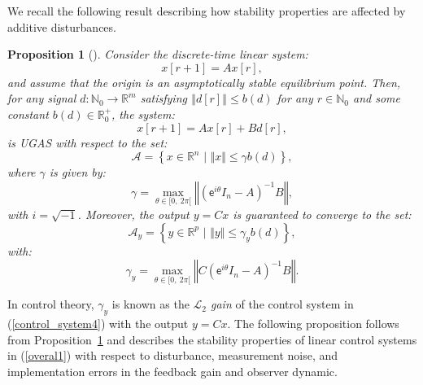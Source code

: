 \documentclass{amsart}
\newtheorem{proposition}[theorem]{Proposition}
\numberwithin{equation}{section}
\newcommand{\R}{{\mathbb{R}}}
\newcommand{\N}{{\mathbb{N}}}
\begin{document}
We recall the following result describing how stability properties are affected by additive disturbances.
\begin{proposition}[\cite{anta}]
\label{prop:anta}
Consider the discrete-time linear system:
\begin{equation}\nonumber
x[r+1]=Ax[r],
\end{equation}
and assume that the origin is an asymptotically stable equilibrium point. Then, for any signal $d:\N_0\rightarrow\R^m$ satisfying $\left\Vert{d}[r]\right\Vert\leq b(d)$ for any $r\in\N_0$ and some constant $b(d)\in\R_0^+$, the system:
\begin{equation}\label{control_system4}
x[r+1]=Ax[r]+Bd[r],
\end{equation}
is UGAS with respect to the set:
\begin{equation}\nonumber
\mathcal{A}=\left\{x\in\R^n\,\,|\,\,\Vert{x}\Vert\leq\gamma b(d)\right\},
\end{equation} 
where $\gamma$ is given by:
\begin{equation}
\gamma=\max_{\theta\in[0,~2\pi[}\left\Vert\left(\textsf{e}^{i\theta}I_{n}-A\right)^{-1}B\right\Vert,
\end{equation}
with $i=\sqrt{-1}$. Moreover, the output $y=Cx$ is guaranteed to converge to the set:
\begin{equation}
\mathcal{A}_y=\left\{y\in\R^p\,\,|\,\,\Vert{y}\Vert\leq\gamma_y b(d)\right\},
\end{equation}  
with:
\begin{equation}\nonumber
\gamma_y=\max_{\theta\in[0,~2\pi[}\left\Vert C\left(\textsf{e}^{i\theta}I_{n}-A\right)^{-1}B\right\Vert.
\end{equation}
\end{proposition}

In control theory, $\gamma_y$ is known as the {\em $\mathcal{L}_2$ gain} of the control system in (\ref{control_system4}) with the output $y=Cx$.
The following proposition follows from Proposition~\ref{prop:anta} and describes the stability properties of linear control systems in (\ref{overal1}) with 
respect to disturbance, measurement noise, and implementation errors in the feedback gain and observer dynamic. 
\end{document}
